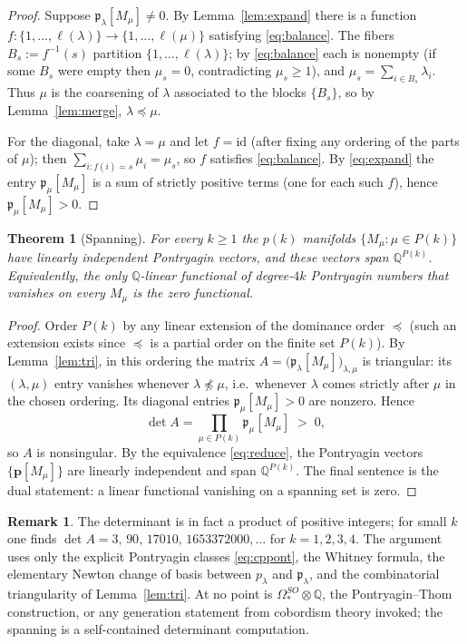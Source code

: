 \documentclass[12pt]{article}
\newtheorem{theorem}{Theorem}
\theoremstyle{definition}
\newtheorem{remark}{Remark}
\begin{document}
\begin{proof}
Suppose $\mathfrak{p}_\lambda[M_\mu]\neq 0$.  By Lemma~\ref{lem:expand} there is a
function $f:\{1,\dots,\ell(\lambda)\}\to\{1,\dots,\ell(\mu)\}$ satisfying
\eqref{eq:balance}.  The fibers $B_s:=f^{-1}(s)$ partition $\{1,\dots,\ell(\lambda)\}$; by
\eqref{eq:balance} each is nonempty (if some $B_s$ were empty then $\mu_s=0$, contradicting
$\mu_s\ge 1$), and $\mu_s=\sum_{i\in B_s}\lambda_i$.  Thus $\mu$ is the coarsening of
$\lambda$ associated to the blocks $\{B_s\}$, so by Lemma~\ref{lem:merge},
$\lambda\preceq\mu$.

For the diagonal, take $\lambda=\mu$ and let $f=\mathrm{id}$ (after fixing any ordering of
the parts of $\mu$); then $\sum_{i:f(i)=s}\mu_i=\mu_s$, so $f$ satisfies \eqref{eq:balance}.
By \eqref{eq:expand} the entry $\mathfrak{p}_\mu[M_\mu]$ is a sum of strictly positive terms
(one for each such $f$), hence $\mathfrak{p}_\mu[M_\mu]>0$.
\end{proof}

\begin{theorem}[Spanning]\label{thm:span}
For every $k\ge 1$ the $p(k)$ manifolds $\{M_\mu:\mu\in P(k)\}$ have linearly independent
Pontryagin vectors, and these vectors span $\mathbb{Q}^{P(k)}$.  Equivalently, the only
$\mathbb{Q}$-linear functional of degree-$4k$ Pontryagin numbers that vanishes on every
$M_\mu$ is the zero functional.
\end{theorem}

\begin{proof}
Order $P(k)$ by any linear extension of the dominance order $\preceq$ (such an extension
exists since $\preceq$ is a partial order on the finite set $P(k)$).  By
Lemma~\ref{lem:tri}, in this ordering the matrix
$A=\big(\mathfrak{p}_\lambda[M_\mu]\big)_{\lambda,\mu}$ is triangular: its $(\lambda,\mu)$
entry vanishes whenever $\lambda\not\preceq\mu$, i.e.\ whenever $\lambda$ comes strictly
after $\mu$ in the chosen ordering.  Its diagonal entries
$\mathfrak{p}_\mu[M_\mu]>0$ are nonzero.  Hence
\[
\det A=\prod_{\mu\in P(k)}\mathfrak{p}_\mu[M_\mu]\;>\;0,
\]
so $A$ is nonsingular.  By the equivalence \eqref{eq:reduce}, the Pontryagin vectors
$\{\mathbf{p}[M_\mu]\}$ are linearly independent and span $\mathbb{Q}^{P(k)}$.  The final
sentence is the dual statement: a linear functional vanishing on a spanning set is zero.
\end{proof}

\begin{remark}
The determinant is in fact a product of positive integers; for small $k$ one finds
$\det A=3,\,90,\,17010,\,1653372000,\dots$ for $k=1,2,3,4$.  The argument uses only the
explicit Pontryagin classes \eqref{eq:cppont}, the Whitney formula, the elementary Newton
change of basis between $p_\lambda$ and $\mathfrak{p}_\lambda$, and the combinatorial
triangularity of Lemma~\ref{lem:tri}.  At no point is $\Omega^{SO}_\ast\otimes\mathbb{Q}$,
the Pontryagin--Thom construction, or any generation statement from cobordism theory
invoked; the spanning is a self-contained determinant computation.
\end{remark}
\end{document}
